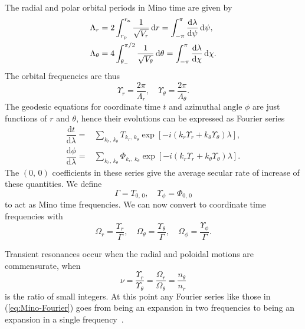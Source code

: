 \documentclass[aps,prd,amsfonts,amssymb,amsmath,nofootinbib,reprint,showpacs]{revtex4}
\newcommand{\eqnref}[1]{(\ref{eq:#1})}
\newcommand{\sub}[1]{\ensuremath{_\text{#1}}}
\newcommand{\dd}{\ensuremath{\mathrm{d}}}
\newcommand{\diff}[2]{\ensuremath{\dfrac{\dd {#1}}{\dd {#2}}}}
\newcommand{\intd}[4]{\ensuremath{\int_{#1}^{#2}{#3}\,\dd{#4}}}
\begin{document}
The radial and polar orbital periods in Mino time are given by
\begin{subequations}
\begin{align}
\Lambda_r = {} & 2\intd{r\sub{p}}{r\sub{a}}{\recip{\sqrt{V_r}}}{r} = \intd{-\pi}{\pi}{\diff{\lambda}{\psi}}{\psi}, \\
\Lambda_\theta = {} & 4\intd{\theta_-}{\pi/2}{\recip{\sqrt{V_\theta}}}{\theta} = \intd{-\pi}{\pi}{\diff{\lambda}{\chi}}{\chi}.
\end{align}
\end{subequations}
The orbital frequencies are thus
\begin{equation}
\Upsilon_r = \frac{2\pi}{\Lambda_r}, \quad \Upsilon_\theta = \frac{2\pi}{\Lambda_\theta}.
\end{equation}
The geodesic equations for coordinate time $t$ and azimuthal angle $\phi$ are just functions of $r$ and $\theta$, hence their evolutions can be expressed as Fourier series~\cite{Drasco2004}
\begin{subequations}
\begin{align}
\diff{t}{\lambda} = {} & \sum_{k_r,\,k_\theta}T_{k_r,\, k_\theta}\exp\left[-i\left(k_r\Upsilon_r + k_\theta\Upsilon_\theta\right)\lambda\right], \\
\diff{\phi}{\lambda} = {} & \sum_{k_r,\,k_\theta}\Phi_{k_r,\, k_\theta}\exp\left[-i\left(k_r\Upsilon_r + k_\theta\Upsilon_\theta\right)\lambda\right].
\label{eq:Mino-Fourier}
\end{align}
\end{subequations}
The $(0,\,0)$ coefficients in these series give the average secular rate of increase of these quantities. We define
\begin{equation}
\Gamma = T_{0,\,0}, \quad \Upsilon_\phi = \Phi_{0,\,0}
\end{equation}
to act as Mino time frequencies. We can now convert to coordinate time frequencies with
\begin{equation}
\Omega_r = \frac{\Upsilon_r}{\Gamma}, \quad \Omega_\theta = \frac{\Upsilon_\theta}{\Gamma}, \quad \Omega_\phi = \frac{\Upsilon_\phi}{\Gamma}.
\end{equation}

Transient resonances occur when the radial and poloidal motions are commensurate, when
\begin{equation}
\nu = \frac{\Upsilon_r}{\Upsilon_\theta} = \frac{\Omega_r}{\Omega_\theta} = \frac{n_\theta}{n_r}
\end{equation}
is the ratio of small integers. At this point any Fourier series like those in \eqnref{Mino-Fourier} goes from being an expansion in two frequencies to being an expansion in a single frequency~\cite{Bosley1992}.
\end{document}

